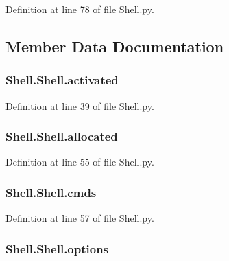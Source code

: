 Definition at line 78 of file Shell.\-py.



\subsection{Member Data Documentation}
\hypertarget{classShell_1_1Shell_a5869d648354d59617e4a9836ef0c4ba3}{
\subsubsection[{activated}]{\setlength{\rightskip}{0pt plus 5cm}Shell.\-Shell.\-activated}}\label{classShell_1_1Shell_a5869d648354d59617e4a9836ef0c4ba3}


Definition at line 39 of file Shell.\-py.

\hypertarget{classShell_1_1Shell_a7d3526fa682799bd7be51fa09c2c9017}{
\subsubsection[{allocated}]{\setlength{\rightskip}{0pt plus 5cm}Shell.\-Shell.\-allocated}}\label{classShell_1_1Shell_a7d3526fa682799bd7be51fa09c2c9017}


Definition at line 55 of file Shell.\-py.

\hypertarget{classShell_1_1Shell_abe2dca7284b995f29494ae5e2ea975a7}{
\subsubsection[{cmds}]{\setlength{\rightskip}{0pt plus 5cm}Shell.\-Shell.\-cmds}}\label{classShell_1_1Shell_abe2dca7284b995f29494ae5e2ea975a7}


Definition at line 57 of file Shell.\-py.

\hypertarget{classShell_1_1Shell_a3e2a9754ac3fa0e2a00c5f0861ef85f2}{
\subsubsection[{options}]{\setlength{\rightskip}{0pt plus 5cm}Shell.\-Shell.\-options}}\label{classShell_1_1Shell_a3e2a9754ac3fa0e2a00c5f0861ef85f2}


